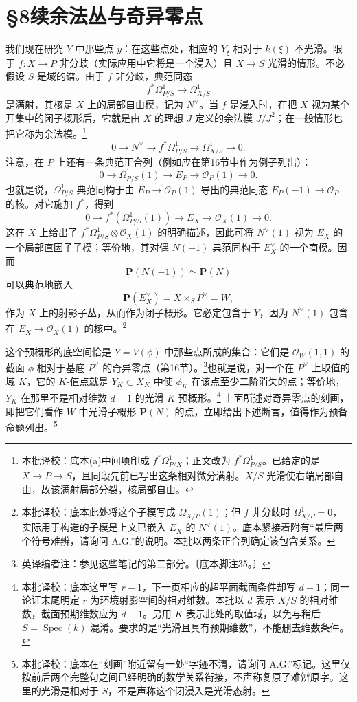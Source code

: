 \documentclass{ctexbook}
\newcommand{\ednote}[1]{\footnote{英译编者注：#1}}
\newcommand{\corr}[1]{\footnote{本批译校：#1}}
\newcommand{\cO}{\mathcal O}
\newcommand{\Spec}{\operatorname{Spec}}
\begin{document}
\chapter*{§8续\quad 余法丛与奇异零点}
我们现在研究 $Y$ 中那些点 $y$：在这些点处，相应的 $Y_\xi$ 相对于 $k(\xi)$ 不光滑。限于 $f:X\to P$ 非分歧（实际应用中它将是一个浸入）且 $X\to S$ 光滑的情形。不必假设 $S$ 是域的谱。由于 $f$ 非分歧，典范同态
\[
f^*\Omega^1_{P/S}\longrightarrow\Omega^1_{X/S}
\]
是满射，其核是 $X$ 上的局部自由模，记为 $N^\vee$。当 $f$ 是浸入时，在把 $X$ 视为某个开集中的闭子概形后，它就是由 $X$ 的理想 $J$ 定义的余法模 $J/J^2$；在一般情形也把它称为余法模。\corr{底本(a)中间项印成 $f^*\Omega^1_{P/X}$；正文改为 $f^*\Omega^1_{P/S}$。已给定的是 $X\to P\to S$，且同段先前已写出这条相对微分满射。$X/S$ 光滑使右端局部自由，故该满射局部分裂，核局部自由。}
\begin{equation}
0\longrightarrow N^\vee\longrightarrow f^*\Omega^1_{P/S}
\longrightarrow\Omega^1_{X/S}\longrightarrow0.\tag{a}
\end{equation}
注意，在 $P$ 上还有一条典范正合列（例如应在第16节中作为例子列出）：
\begin{equation}
0\longrightarrow\Omega^1_{P/S}(1)\longrightarrow E_P
\longrightarrow\cO_P(1)\longrightarrow0.\tag{b}
\end{equation}
也就是说，$\Omega^1_{P/S}$ 典范同构于由 $E_P\to\cO_P(1)$ 导出的典范同态 $E_P(-1)\to\cO_P$ 的核。对它施加 $f^*$，得到
\begin{equation}
0\longrightarrow f^*(\Omega^1_{P/S}(1))\longrightarrow E_X
\longrightarrow\cO_X(1)\longrightarrow0.\tag{$b_1$}
\end{equation}
这在 $X$ 上给出了 $f^*\Omega^1_{P/S}\otimes\cO_X(1)$ 的明确描述，因此可将 $N^\vee(1)$ 视为 $E_X$ 的一个局部直因子子模；等价地，其对偶 $N(-1)$ 典范同构于 $E_X^\vee$ 的一个商模。因而
\[
\mathbf P(N(-1))\simeq\mathbf P(N)
\]
可以典范地嵌入
\[
\mathbf P(E_X^\vee)=X\times_S P^\vee=W,
\]
作为 $X$ 上的射影子丛，从而作为闭子概形。它必定包含于 $Y$，因为 $N^\vee(1)$ 包含在 $E_X\to\cO_X(1)$ 的核中。\corr{底本此处将这个子模写成 $\Omega_{X/P}(1)$；但 $f$ 非分歧时 $\Omega^1_{X/P}=0$，实际用于构造的子模是上文已嵌入 $E_X$ 的 $N^\vee(1)$。底本紧接着附有“最后两个符号难辨，请询问 A.G.”的说明。本批以两条正合列确定该包含关系。}

这个预概形的底空间恰是 $Y=V(\phi)$ 中那些点所成的集合：它们是 $\cO_W(1,1)$ 的截面 $\phi$ 相对于基底 $P^\vee$ 的奇异零点（第16节）。\ednote{参见这些笔记的第二部分。〔底本脚注35。〕}也就是说，对一个在 $P^\vee$ 上取值的域 $K$，它的 $K$-值点就是 $Y_K\subset X_K$ 中使 $\phi_K$ 在该点至少二阶消失的点；等价地，$Y_K$ 在那里不是相对维数 $d-1$ 的光滑 $K$-预概形。\corr{底本这里写 $r-1$，下一页相应的超平面截面条件却写 $d-1$；同一论证末尾明定 $r$ 为环境射影空间的相对维数。本批以 $d$ 表示 $X/S$ 的相对维数，截面预期维数应为 $d-1$。另用 $K$ 表示此处的取值域，以免与稍后 $S=\Spec(k)$ 混淆。要求的是“光滑且具有预期维数”，不能删去维数条件。}
上面所述对奇异零点的刻画，即把它们看作 $W$ 中光滑子概形 $\mathbf P(N)$ 的点，立即给出下述断言，值得作为预备命题列出。\corr{底本在“刻画”附近留有一处“字迹不清，请询问 A.G.”标记。这里仅按前后两个完整句之间已经明确的数学关系衔接，不声称复原了难辨原字。这里的光滑是相对于 $S$，不是声称这个闭浸入是光滑态射。}
\end{document}
